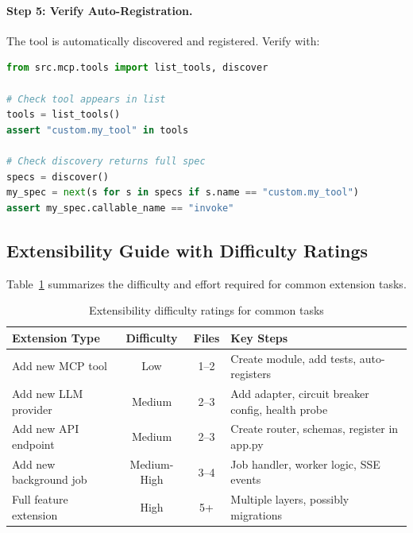 \paragraph{Step 5: Verify Auto-Registration.}
The tool is automatically discovered and registered. Verify with:

\begin{lstlisting}[language=Python, caption={Verifying tool auto-registration}, label={lst:verify-registration}]
from src.mcp.tools import list_tools, discover

# Check tool appears in list
tools = list_tools()
assert "custom.my_tool" in tools

# Check discovery returns full spec
specs = discover()
my_spec = next(s for s in specs if s.name == "custom.my_tool")
assert my_spec.callable_name == "invoke"
\end{lstlisting}

\subsection{Extensibility Guide with Difficulty Ratings}
\label{subsec:extensibility-guide}

Table~\ref{tab:extensibility-difficulty} summarizes the difficulty and effort required for common extension tasks.

\begin{table}[htbp]
    \centering
    \caption{Extensibility difficulty ratings for common tasks}
    \label{tab:extensibility-difficulty}
    \begin{tabularx}{\textwidth}{lccX}
        \toprule
        \textbf{Extension Type} & \textbf{Difficulty} & \textbf{Files} & \textbf{Key Steps} \\
        \midrule
        Add new MCP tool & Low & 1--2 & Create module, add tests, auto-registers \\
        Add new LLM provider & Medium & 2--3 & Add adapter, circuit breaker config, health probe \\
        Add new API endpoint & Medium & 2--3 & Create router, schemas, register in app.py \\
        Add new background job & Medium-High & 3--4 & Job handler, worker logic, SSE events \\
        Full feature extension & High & 5+ & Multiple layers, possibly migrations \\
        \bottomrule
    \end{tabularx}
\end{table}

